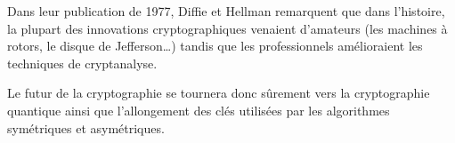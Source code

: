 Dans leur publication de 1977\cite{NewDirectionsInCryptography},
Diffie et Hellman remarquent que dans l'histoire, la plupart des
innovations cryptographiques venaient d'amateurs (les machines à
rotors, le disque de Jefferson\dots) tandis que les professionnels
amélioraient les techniques de cryptanalyse.

Le futur de la cryptographie se tournera donc sûrement vers la
cryptographie quantique ainsi que l'allongement des clés utilisées par
les algorithmes symétriques et asymétriques.


